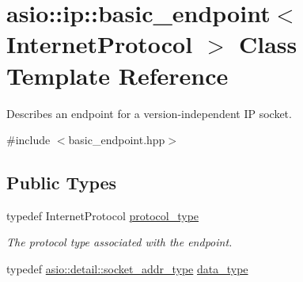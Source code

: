 \hypertarget{classasio_1_1ip_1_1basic__endpoint}{}\section{asio\+:\+:ip\+:\+:basic\+\_\+endpoint$<$ Internet\+Protocol $>$ Class Template Reference}
\label{classasio_1_1ip_1_1basic__endpoint}


Describes an endpoint for a version-\/independent I\+P socket.  




{\ttfamily \#include $<$basic\+\_\+endpoint.\+hpp$>$}

\subsection*{Public Types}
\begin{DoxyCompactItemize}
\item 
typedef Internet\+Protocol \hyperlink{classasio_1_1ip_1_1basic__endpoint_a0a1e636ae6281b37349b7dbdb4791a09}{protocol\+\_\+type}
\begin{DoxyCompactList}\small\item\em The protocol type associated with the endpoint. \end{DoxyCompactList}\item 
typedef \hyperlink{namespaceasio_1_1detail_a40a7b0385a38f87815ffbb8df5e34d05}{asio\+::detail\+::socket\+\_\+addr\+\_\+type} \hyperlink{classasio_1_1ip_1_1basic__endpoint_a080cc84bcb7c39ec426a3670b9456c44}{data\+\_\+type}
\end{DoxyCompactItemize}
